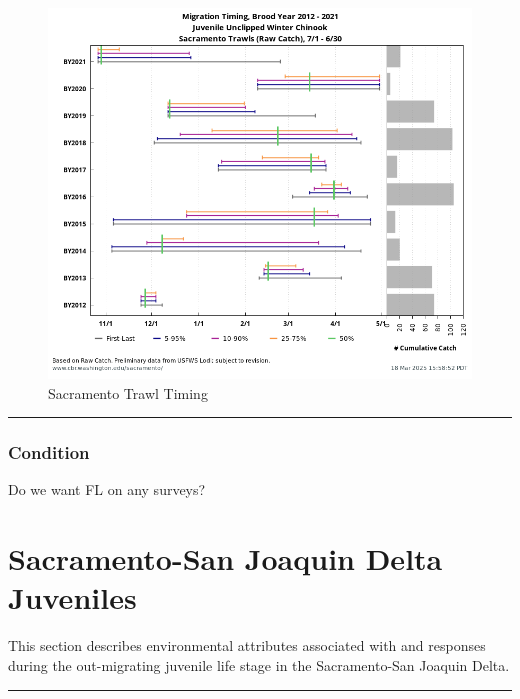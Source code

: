 \documentclass[
]{book}
\theoremstyle{definition}
\theoremstyle{definition}
\theoremstyle{definition}
\theoremstyle{definition}
\theoremstyle{remark}
\begin{document}
\begin{figure}
\includegraphics[width=1.5\linewidth]{figures/migtiming2021_sactrawl} \caption{Sacramento Trawl Timing}\label{fig:sactrawl-timing-fig}
\end{figure}

\begin{center}\rule{0.5\linewidth}{0.5pt}\end{center}

\hypertarget{condition-1}{%
\subsection{Condition}\label{condition-1}}

Do we want FL on any surveys?

\hypertarget{sacramento-san-joaquin-delta-juveniles}{%
\chapter{Sacramento-San Joaquin Delta Juveniles}\label{sacramento-san-joaquin-delta-juveniles}}

This section describes environmental attributes associated with and responses during the out-migrating juvenile life stage in the Sacramento-San Joaquin Delta.

\begin{center}\rule{0.5\linewidth}{0.5pt}\end{center}
\end{document}
